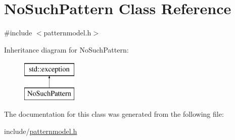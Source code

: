 \hypertarget{classNoSuchPattern}{}\section{No\+Such\+Pattern Class Reference}
\label{classNoSuchPattern}


{\ttfamily \#include $<$patternmodel.\+h$>$}

Inheritance diagram for No\+Such\+Pattern\+:\begin{figure}[H]
\begin{center}
\leavevmode
\includegraphics[height=2.000000cm]{classNoSuchPattern}
\end{center}
\end{figure}


The documentation for this class was generated from the following file\+:\begin{DoxyCompactItemize}
\item 
include/\hyperlink{patternmodel_8h}{patternmodel.\+h}\end{DoxyCompactItemize}

